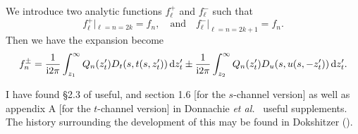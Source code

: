 \begin{theorem}
We introduce two analytic functions $f^{+}_{\ell}$ and
$f^{-}_{\ell}$ such that
\begin{equation}
f^{+}_{\ell}|_{\ell=n=2k}=f_{n},\quad\mbox{and}\quad
f^{-}_{\ell}|_{\ell=n=2k+1}=f_{n}.
\end{equation}
Then we have the expansion become
\begin{equation}
f^{\pm}_{n} = \frac{1}{\mathrm{i}2\pi}\int^{\infty}_{z_{1}}Q_{n}(z_{t}')D_{t}(s,t(s,z_{t}'))\,\mathrm{d} z_{t}'
\pm \frac{1}{\mathrm{i}2\pi}\int^{\infty}_{z_{2}}Q_{n}(z_{t}')D_{u}(s,u(s,-z_{t}'))\,\mathrm{d} z_{t}'.
\end{equation}
\end{theorem}

I have found \S2.3 of  useful, and section 1.6 [for
the $s$-channel version] as well
as appendix A [for the $t$-channel version] in Donnachie \textit{et al.}~\cite{Donnachie:2002en}
useful supplements. The history surrounding the development of this may
be found in Dokshitzer ().